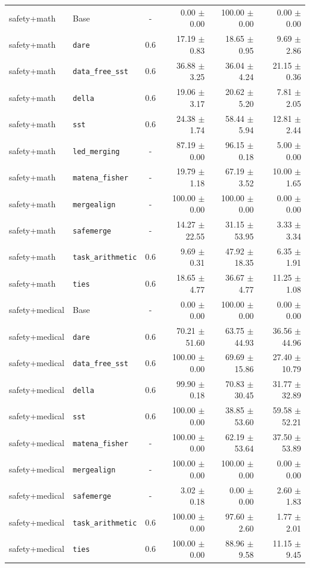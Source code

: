 \documentclass{article}
\begin{document}
\begin{table}[H]
{\begin{tabular}{llcrrr}
\midrule
safety+math & Base & - & 0.00 $\pm$ 0.00 & 100.00 $\pm$ 0.00 & 0.00 $\pm$ 0.00 \\
safety+math & \texttt{dare} & 0.6 & 17.19 $\pm$ 0.83 & 18.65 $\pm$ 0.95 & 9.69 $\pm$ 2.86 \\
safety+math & \texttt{data\_free\_sst} & 0.6 & 36.88 $\pm$ 3.25 & 36.04 $\pm$ 4.24 & 21.15 $\pm$ 0.36 \\
safety+math & \texttt{della} & 0.6 & 19.06 $\pm$ 3.17 & 20.62 $\pm$ 5.20 & 7.81 $\pm$ 2.05 \\
safety+math & \texttt{sst} & 0.6 & 24.38 $\pm$ 1.74 & 58.44 $\pm$ 5.94 & 12.81 $\pm$ 2.44 \\
safety+math & \texttt{led\_merging} & - & 87.19 $\pm$ 0.00 & 96.15 $\pm$ 0.18 & 5.00 $\pm$ 0.00 \\
safety+math & \texttt{matena\_fisher} & - & 19.79 $\pm$ 1.18 & 67.19 $\pm$ 3.52 & 10.00 $\pm$ 1.65 \\
safety+math & \texttt{mergealign} & - & 100.00 $\pm$ 0.00 & 100.00 $\pm$ 0.00 & 0.00 $\pm$ 0.00 \\
safety+math & \texttt{safemerge} & - & 14.27 $\pm$ 22.55 & 31.15 $\pm$ 53.95 & 3.33 $\pm$ 3.34 \\
safety+math & \texttt{task\_arithmetic} & 0.6 & 9.69 $\pm$ 0.31 & 47.92 $\pm$ 18.35 & 6.35 $\pm$ 1.91 \\
safety+math & \texttt{ties} & 0.6 & 18.65 $\pm$ 4.77 & 36.67 $\pm$ 4.77 & 11.25 $\pm$ 1.08 \\
\midrule
safety+medical & Base & - & 0.00 $\pm$ 0.00 & 100.00 $\pm$ 0.00 & 0.00 $\pm$ 0.00 \\
safety+medical & \texttt{dare} & 0.6 & 70.21 $\pm$ 51.60 & 63.75 $\pm$ 44.93 & 36.56 $\pm$ 44.96 \\
safety+medical & \texttt{data\_free\_sst} & 0.6 & 100.00 $\pm$ 0.00 & 69.69 $\pm$ 15.86 & 27.40 $\pm$ 10.79 \\
safety+medical & \texttt{della} & 0.6 & 99.90 $\pm$ 0.18 & 70.83 $\pm$ 30.45 & 31.77 $\pm$ 32.89 \\
safety+medical & \texttt{sst} & 0.6 & 100.00 $\pm$ 0.00 & 38.85 $\pm$ 53.60 & 59.58 $\pm$ 52.21 \\
safety+medical & \texttt{matena\_fisher} & - & 100.00 $\pm$ 0.00 & 62.19 $\pm$ 53.64 & 37.50 $\pm$ 53.89 \\
safety+medical & \texttt{mergealign} & - & 100.00 $\pm$ 0.00 & 100.00 $\pm$ 0.00 & 0.00 $\pm$ 0.00 \\
safety+medical & \texttt{safemerge} & - & 3.02 $\pm$ 0.18 & 0.00 $\pm$ 0.00 & 2.60 $\pm$ 1.83 \\
safety+medical & \texttt{task\_arithmetic} & 0.6 & 100.00 $\pm$ 0.00 & 97.60 $\pm$ 2.60 & 1.77 $\pm$ 2.01 \\
safety+medical & \texttt{ties} & 0.6 & 100.00 $\pm$ 0.00 & 88.96 $\pm$ 9.58 & 11.15 $\pm$ 9.45 \\
\bottomrule
\end{tabular}
}
\end{table}
\end{document}
